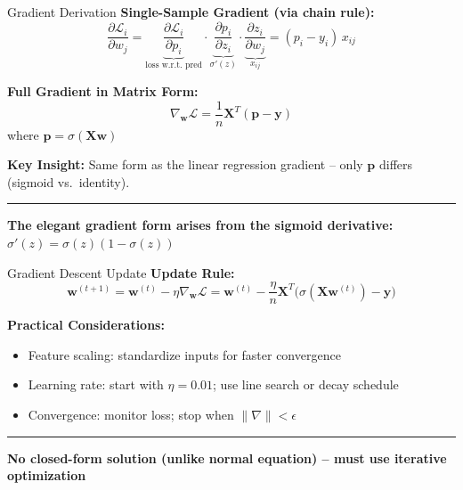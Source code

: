 \documentclass[8pt,aspectratio=169]{beamer}
\newcommand{\bottomnote}[1]{%
\vfill
\vspace{-2mm}
\textcolor{mllavender2}{\rule{\textwidth}{0.4pt}}
\vspace{1mm}
\footnotesize
\textbf{#1}
}
\begin{document}
\begin{frame}[t]{Gradient Derivation}
\textbf{Single-Sample Gradient (via chain rule):}
$$\frac{\partial \mathcal{L}_i}{\partial w_j} = \underbrace{\frac{\partial \mathcal{L}_i}{\partial p_i}}_{\text{loss w.r.t.\ pred}} \cdot \underbrace{\frac{\partial p_i}{\partial z_i}}_{\sigma'(z)} \cdot \underbrace{\frac{\partial z_i}{\partial w_j}}_{x_{ij}} = (p_i - y_i)\, x_{ij}$$

\vspace{0.5em}
\textbf{Full Gradient in Matrix Form:}
$$\nabla_{\mathbf{w}} \mathcal{L} = \frac{1}{n}\mathbf{X}^T(\mathbf{p} - \mathbf{y})$$
where $\mathbf{p} = \sigma(\mathbf{X}\mathbf{w})$
\vspace{0.5em}

\textbf{Key Insight:} Same form as the linear regression gradient -- only $\mathbf{p}$ differs (sigmoid vs.\ identity).
\bottomnote{The elegant gradient form arises from the sigmoid derivative: $\sigma'(z) = \sigma(z)(1-\sigma(z))$}
\end{frame}

\begin{frame}[t]{Gradient Descent Update}
\textbf{Update Rule:}
$$\mathbf{w}^{(t+1)} = \mathbf{w}^{(t)} - \eta \nabla_{\mathbf{w}} \mathcal{L} = \mathbf{w}^{(t)} - \frac{\eta}{n}\mathbf{X}^T\!\bigl(\sigma(\mathbf{X}\mathbf{w}^{(t)}) - \mathbf{y}\bigr)$$

\vspace{0.5em}
\textbf{Practical Considerations:}
\begin{itemize}
\item Feature scaling: standardize inputs for faster convergence
\item Learning rate: start with $\eta = 0.01$; use line search or decay schedule
\item Convergence: monitor loss; stop when $\|\nabla\| < \epsilon$
\end{itemize}
\bottomnote{No closed-form solution (unlike normal equation) -- must use iterative optimization}
\end{frame}
\end{document}
